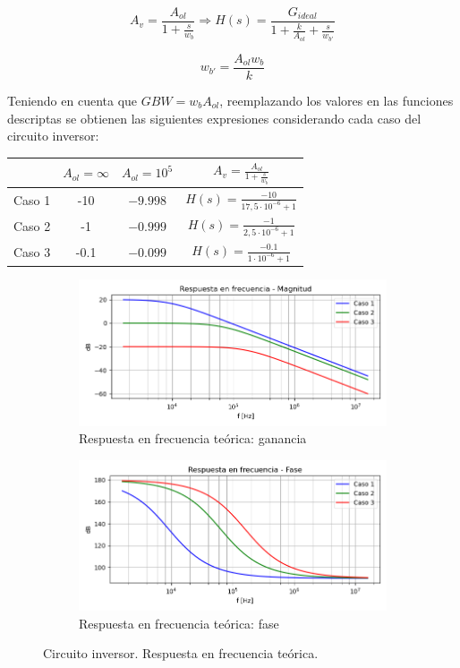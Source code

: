 $$A_{v} = \frac{A_{ol}}{1+\frac{s}{w_{b}}}\Rightarrow H(s)=\frac{G_{ideal}}{1+\frac{k}{A_{ol}}+\frac{s}{w_{b'}}}$$

$$w_{b'} = \frac{A_{ol}w_{b}}{k}$$

Teniendo en cuenta que $GBW = w_{b}A_{ol}$, reemplazando los valores en las funciones descriptas se obtienen las siguientes expresiones considerando cada caso del circuito inversor:

\begin{table}[H]
\centering
\begin{tabular}{c|c|c|c}
       & $A_{ol} = \infty$  & $A_{ol} = 10^{5}$ & $A_{v} = \frac{A_{ol}}{1+\frac{s}{w_{b}}}$ \\ \hline
Caso 1 & -10  & $-9.998$  & $H(s)=\frac{-10}{17,5\cdot 10^{-6}+1}$  \\ \cline{1-1}
Caso 2 & -1  & $-0.999$   & $H(s)=\frac{-1}{2,5\cdot 10^{-6}+1}$  \\ \cline{1-1}
Caso 3 & -0.1  & $-0.099$  & $H(s)=\frac{-0.1}{1\cdot 10^{-6}+1}$

\end{tabular}
\end{table}

\begin{figure}[H]
	\begin{subfigure}{1\textwidth}
	    \centering
		\includegraphics[width=.8\linewidth]{./Imagenes/InversorCasosGain.png}  
		\caption{Respuesta en frecuencia teórica: ganancia}
	\end{subfigure}
	\newline
	\begin{subfigure}{1\textwidth}
	    \centering
		\includegraphics[width=.8\linewidth]{./Imagenes/InversorCasosPhase.png}  
		\caption{Respuesta en frecuencia teórica: fase}
	\end{subfigure}
	\caption{Circuito inversor. Respuesta en frecuencia teórica.}
	\label{fig:invcasos}
\end{figure} 


